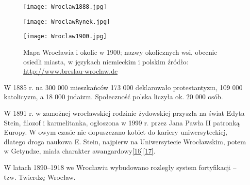 \documentclass{article}
\begin{document}
\newpage
\begin{figure}
\centering
\begin{minipage}{.5\textwidth}
  \centering
  \texttt{[image: Wroclaw1888.jpg]}
\end{minipage}%
\begin{minipage}{.5\textwidth}
  \centering
  \texttt{[image: WroclawRynek.jpg]}
\end{minipage}
\end{figure}

\begin{figure}[h]
\centering
\texttt{[image: Wroclaw1900.jpg]}
\caption{Mapa Wrocławia i okolic w 1900;
nazwy okolicznych wsi, obecnie osiedli miasta, w językach niemieckim i polskim
źródło: \url{http://www.breslau-wroclaw.de}}
\end{figure}


\newpage
W 1885 r. na 300 000 mieszkańców 173 000 deklarowało protestantyzm, 109 000 katolicyzm, a 18 000 judaizm. Społeczność polska liczyła ok. 20 000 osób.

W 1891 r. w zamożnej wrocławskiej rodzinie żydowskiej przyszła na świat Edyta Stein, filozof i karmelitanka, ogłoszona w 1999 r. przez Jana Pawła II patronką Europy. W owym czasie nie dopuszczano kobiet do kariery uniwersyteckiej, dlatego droga naukowa E. Stein, najpierw na Uniwersytecie Wrocławskim, potem w Getyndze, miała charakter awangardowy\hyperref[16]{[16]}\hyperref[17]{[17]}.

W latach 1890–1918 we Wrocławiu wybudowano rozległy system fortyfikacji – tzw. Twierdzę Wrocław.
\end{document}
